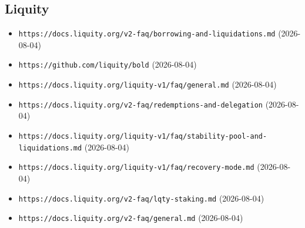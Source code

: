 \subsection*{Liquity}
\begin{itemize}\setlength{\itemsep}{0pt}\small
\item \texttt{https://docs.liquity.org/v2-faq/borrowing-and-liquidations.md} (2026-08-04)
\item \texttt{https://github.com/liquity/bold} (2026-08-04)
\item \texttt{https://docs.liquity.org/liquity-v1/faq/general.md} (2026-08-04)
\item \texttt{https://docs.liquity.org/v2-faq/redemptions-and-delegation} (2026-08-04)
\item \texttt{https://docs.liquity.org/liquity-v1/faq/stability-pool-and-liquidations.md} (2026-08-04)
\item \texttt{https://docs.liquity.org/liquity-v1/faq/recovery-mode.md} (2026-08-04)
\item \texttt{https://docs.liquity.org/v2-faq/lqty-staking.md} (2026-08-04)
\item \texttt{https://docs.liquity.org/v2-faq/general.md} (2026-08-04)
\end{itemize}


